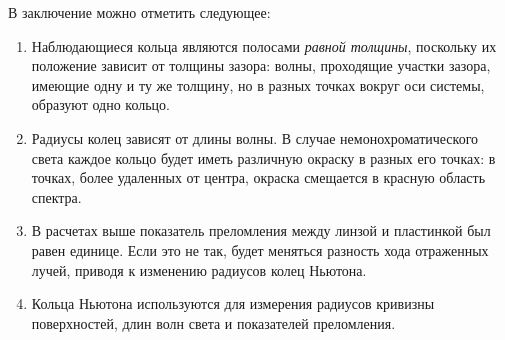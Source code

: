 В заключение можно отметить следующее:

\begin{enumerate}
    \item Наблюдающиеся кольца являются полосами \textit{равной толщины}, поскольку их положение зависит от толщины зазора: волны, проходящие участки зазора, имеющие одну и ту же толщину, но в разных точках вокруг оси системы, образуют одно кольцо.
    \item Радиусы колец зависят от длины волны. В случае немонохроматического света каждое кольцо будет иметь различную окраску в разных его точках: в точках, более удаленных от центра, окраска смещается в красную область спектра.
    \item В расчетах выше показатель преломления между линзой и пластинкой был равен единице. Если это не так, будет меняться разность хода отраженных лучей, приводя к изменению радиусов колец Ньютона.
    \item Кольца Ньютона используются для измерения радиусов кривизны поверхностей, длин волн света и показателей преломления.
\end{enumerate}

